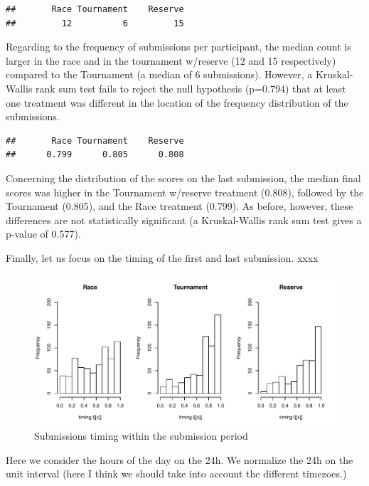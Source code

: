 \documentclass[12pt,]{article}
\theoremstyle{plain} %
\begin{document}
\begin{verbatim}
##       Race Tournament    Reserve 
##         12          6         15
\end{verbatim}

Regarding to the frequency of submissions per participant, the median
count is larger in the race and in the tournament w/reserve (12 and 15
respectively) compared to the Tournament (a median of 6 submissions).
However, a Kruskal-Wallis rank sum test fails to reject the null
hypothesis (p=0.794) that at least one treatment was different in the
location of the frequency distribution of the submissions.

\begin{verbatim}
##       Race Tournament    Reserve 
##      0.799      0.805      0.808
\end{verbatim}

Concerning the distribution of the scores on the last submission, the
median final scores was higher in the Tournament w/reserve treatment
(0.808), followed by the Tournament (0.805), and the Race treatment
(0.799). As before, however, these differences are not statistically
significant (a Kruskal-Wallis rank sum test gives a p-value of 0.577).

Finally, let us focus on the timing of the first and last submission.
xxxx

\begin{figure}
\centering
\includegraphics{Figures/unnamed-chunk-17-1.pdf}
\caption{Submissions timing within the submission period}
\end{figure}

Here we consider the hours of the day on the 24h. We normalize the 24h
on the unit interval (here I think we should take into account the
different timezoes.)
\end{document}

